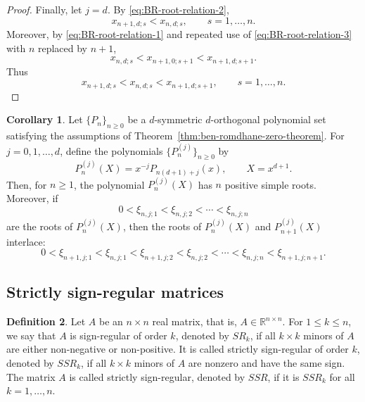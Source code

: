 \documentclass[preprint,3p,10pt]{elsarticle}
\theoremstyle{definition}
\newtheorem{definition}{Definition}[section]
\newtheorem{corollary}[definition]{Corollary}
\begin{document}
\begin{proof}
Finally, let \(j=d\). By \eqref{eq:BR-root-relation-2},
\begin{equation}
    x_{n+1,d;s}<x_{n,d;s},
    \qquad s=1,\ldots,n.
\end{equation}
Moreover, by \eqref{eq:BR-root-relation-1} and repeated use of
\eqref{eq:BR-root-relation-3} with \(n\) replaced by \(n+1\),
\begin{equation}
    x_{n,d;s}
    <
    x_{n+1,0;s+1}
    <
    x_{n+1,d;s+1}.
\end{equation}
Thus
\begin{equation}
    x_{n+1,d;s}<x_{n,d;s}<x_{n+1,d;s+1},
    \qquad s=1,\ldots,n.
\end{equation}
\end{proof}


\begin{corollary}\label{thm:defined-polynomials-roots}
Let \(\{P_n\}_{n\geq0}\) be a \(d\)-symmetric \(d\)-orthogonal polynomial set satisfying the assumptions of
Theorem~\ref{thm:ben-romdhane-zero-theorem}.
For \(j=0,1,\ldots,d\), define the polynomials
\(\{P_n^{(j)}\}_{n\geq0}\) by
\begin{equation}
    P_n^{(j)}(X)=x^{-j}P_{n(d+1)+j}(x),
    \qquad X=x^{d+1}.
\end{equation}
Then, for \(n\geq1\), the polynomial \(P_n^{(j)}(X)\) has \(n\) positive
simple roots. Moreover, if
\begin{equation}
    0<\xi_{n,j;1}<\xi_{n,j;2}<\cdots<\xi_{n,j;n}
\end{equation}
are the roots of \(P_n^{(j)}(X)\), then the roots of \(P_n^{(j)}(X)\) and
\(P_{n+1}^{(j)}(X)\) interlace:
\begin{equation}
    0<
    \xi_{n+1,j;1}
    <
    \xi_{n,j;1}
    <
    \xi_{n+1,j;2}
    <
    \xi_{n,j;2}
    <
    \cdots
    <
    \xi_{n,j;n}
    <
    \xi_{n+1,j;n+1}.
\end{equation}
\end{corollary}





\subsection{Strictly sign-regular matrices}

\begin{definition}
Let \(A\) be an \(n\times n\) real matrix, that is,
\(A\in\mathbb{R}^{n\times n}\). For \(1\le k\le n\), we say that \(A\) is
sign-regular of order \(k\), denoted by \(SR_k\), if all \(k\times k\)
minors of \(A\) are either non-negative or non-positive. It is called strictly sign-regular of order \(k\), denoted by \(SSR_k\), if all
\(k\times k\) minors of \(A\) are nonzero and have the same sign.
The matrix \(A\) is called strictly sign-regular, denoted by \(SSR\), if it is
\(SSR_k\) for all \(k=1,\ldots,n\).
\end{definition}
\end{document}
